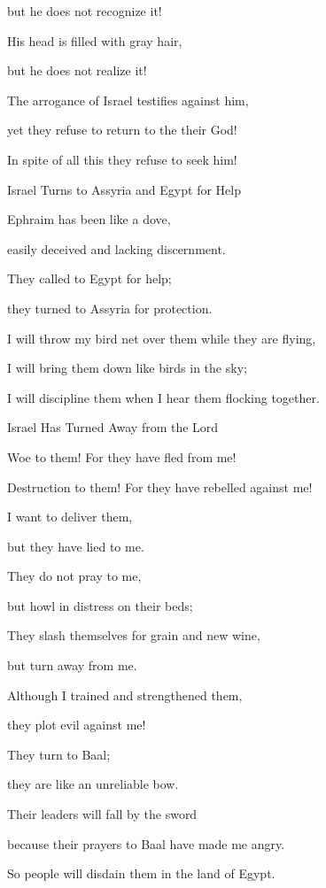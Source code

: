 {\par }{\Q but he does not
recognize
it!
\par }{\Q His head is filled
with gray hair,
\par }{\Q but he does not
realize it!
\par }{\Q {}The arrogance
of Israel
testifies
against him,
\par }{\Q yet they refuse
to return
to
the {}
their God!
\par }{\Q In spite of all
this
they refuse
to seek him!
\par }{\SH Israel Turns to Assyria and Egypt for Help
\par }{\Q {}Ephraim
has been like a dove,
\par }{\Q easily deceived
and lacking
discernment.
\par }{\Q They called
to Egypt
for help;
\par }{\Q they turned to Assyria
for protection.
\par }{\Q {}I will throw
my bird net
over
them while they are flying,
\par }{\Q I will bring
them down
like birds
in the sky;
\par }{\Q I will discipline
them when I hear
them flocking together.
\par }{\SH Israel Has Turned Away from the Lord
\par }{\Q {}Woe
to them! For
they have fled
from
me!
\par }{\Q Destruction
to them! For
they have rebelled
against me!
\par }{\Q I
want to deliver
them,
\par }{\Q but they
have
lied to me.
\par }{\Q {}They do not
pray
to
me,
\par }{\Q but howl
in distress on
their beds;
\par }{\Q They slash
themselves for
grain
and new wine,
\par }{\Q but turn away from me.
\par }{\Q {}Although
I
trained
and strengthened
them,
\par }{\Q they plot
evil against me!
\par }{\Q {}They turn
to Baal;
\par }{\Q they are
like an unreliable
bow.
\par }{\Q Their leaders
will fall
by the sword
\par }{\Q because their prayers to Baal
have made me angry.
\par }{\Q So
people will disdain
them in the land
of Egypt.

}
